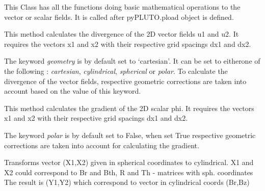\documentclass[letterpaper,10pt,english]{sphinxmanual}
\begin{document}
\begin{fulllineitems}
\label{tools:pyPLUTO.Tools}
This Class has all the functions doing basic mathematical
operations to the vector or scalar fields.
It is called after pyPLUTO.pload object is defined.

\begin{fulllineitems}
\label{tools:pyPLUTO.Tools.Div}
This method calculates the divergence of the 2D vector fields u1 and u2. It requires the vectors x1 and x2 with their respective grid spacings dx1 and dx2.

The keyword \emph{geometry} is by default set to `cartesian'. It can be set to eitherone of the following : \emph{cartesian}, \emph{cylindrical}, \emph{spherical} or \emph{polar}. To calculate the divergence of the vector fields, respective geometric corrections are taken into account based on the value of this keyword.

\end{fulllineitems}


\begin{fulllineitems}
\label{tools:pyPLUTO.Tools.Grad}
This method calculates the gradient of the 2D scalar phi. It requires the vectors x1 and x2 with their respective grid spacings dx1 and dx2.

The keyword \emph{polar} is by default set to False, when set True respective geometric corrections are taken into account for calculating the gradient.

\end{fulllineitems}


\begin{fulllineitems}
\label{tools:pyPLUTO.Tools.RTh2Cyl}
Transforms vector (X1,X2) given in spherical coordinates to cylindrical. 
X1 and X2 could correspond to Br and Bth, R and Th - matrices with sph. coordinates
The result is (Y1,Y2) which correspond to vector in cylindrical coords (Br,Bz)


\end{fulllineitems}
\end{fulllineitems}
\end{document}
